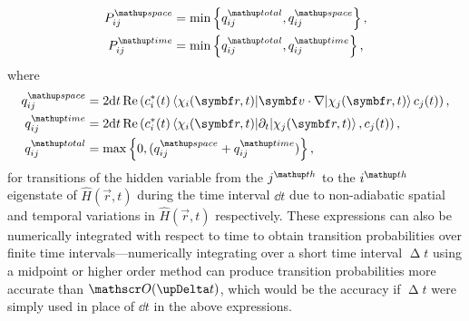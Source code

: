 \begin{align}
P^\up{space}_{ij} &= \min\left\{q^\up{total}_{ij}, q^\up{space}_{ij}\right\},\\
P^\up{time}_{ij} &= \min\left\{q^\up{total}_{ij}, q^\up{time}_{ij}\right\},
\end{align}
where
\begin{align}
q^\up{space}_{ij} &= 2\dd t\re\left(c_i^*(t)
\matrixel{\chi_i(\vec r, t)}{\vec v\cdot\nabla}{\chi_j(\vec r, t)}
 c_j(t)\right),\label{eq:q_space}\\
q^\up{time}_{ij} &= 2\dd t\re\left(c_i^*(t)
\matrixel{\chi_i(\vec r, t)}{\partial_t}{\chi_j(\vec r, t)},
 c_j(t)\right),\label{eq:q_time}\\
q^\up{total}_{ij} &= \max\left\{0, (q^\up{space}_{ij} + q^\up{time}_{ij})\right\},
\end{align}
for transitions of the hidden variable from the $j^\up{th}$ to the $i^\up{th}$ eigenstate of $\hat H(\vec r, t)$ during the time interval $\dd t$ due to non-adiabatic spatial and temporal variations in $\hat H(\vec r, t)$ respectively. These expressions can also be numerically integrated with respect to time to obtain transition probabilities over finite time intervals---numerically integrating over a short time interval $\upDelta t$ using a midpoint or higher order method can produce transition probabilities more accurate than $\Ord{\upDelta t}$, which would be the accuracy if $\upDelta t$ were simply used in place of $\dd t$ in the above expressions.

